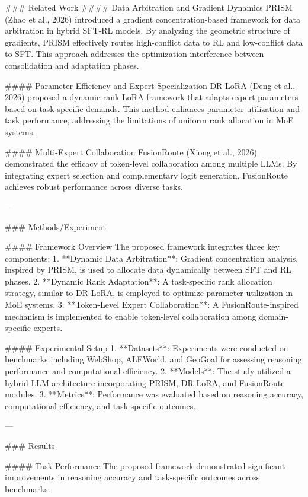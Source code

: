 ### Related Work  
#### Data Arbitration and Gradient Dynamics  
PRISM (Zhao et al., 2026) introduced a gradient concentration-based framework for data arbitration in hybrid SFT-RL models. By analyzing the geometric structure of gradients, PRISM effectively routes high-conflict data to RL and low-conflict data to SFT. This approach addresses the optimization interference between consolidation and adaptation phases.

#### Parameter Efficiency and Expert Specialization  
DR-LoRA (Deng et al., 2026) proposed a dynamic rank LoRA framework that adapts expert parameters based on task-specific demands. This method enhances parameter utilization and task performance, addressing the limitations of uniform rank allocation in MoE systems.

#### Multi-Expert Collaboration  
FusionRoute (Xiong et al., 2026) demonstrated the efficacy of token-level collaboration among multiple LLMs. By integrating expert selection and complementary logit generation, FusionRoute achieves robust performance across diverse tasks.

---

### Methods/Experiment  

#### Framework Overview  
The proposed framework integrates three key components:  
1. **Dynamic Data Arbitration**: Gradient concentration analysis, inspired by PRISM, is used to allocate data dynamically between SFT and RL phases.  
2. **Dynamic Rank Adaptation**: A task-specific rank allocation strategy, similar to DR-LoRA, is employed to optimize parameter utilization in MoE systems.  
3. **Token-Level Expert Collaboration**: A FusionRoute-inspired mechanism is implemented to enable token-level collaboration among domain-specific experts.

#### Experimental Setup  
1. **Datasets**: Experiments were conducted on benchmarks including WebShop, ALFWorld, and GeoGoal for assessing reasoning performance and computational efficiency.  
2. **Models**: The study utilized a hybrid LLM architecture incorporating PRISM, DR-LoRA, and FusionRoute modules.  
3. **Metrics**: Performance was evaluated based on reasoning accuracy, computational efficiency, and task-specific outcomes.  

---

### Results  

#### Task Performance  
The proposed framework demonstrated significant improvements in reasoning accuracy and task-specific outcomes across benchmarks.

